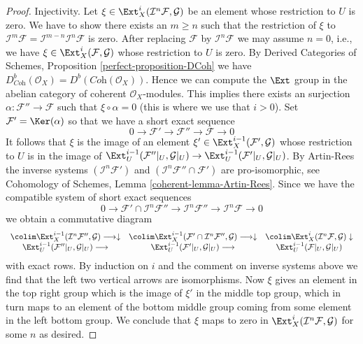 \begin{proof}
\medskip\noindent
Injectivity. Let $\xi \in \Ext^i_X(\mathcal{I}^n\mathcal{F}, \mathcal{G})$
be an element whose restriction to $U$ is zero. We have to show there exists
an $m \geq n$ such that the restriction of $\xi$ to
$\mathcal{I}^m\mathcal{F} = \mathcal{I}^{m - n}\mathcal{I}^n\mathcal{F}$
is zero. After replacing $\mathcal{F}$ by $\mathcal{I}^n\mathcal{F}$
we may assume $n = 0$, i.e., we have
$\xi \in \Ext^i_X(\mathcal{F}, \mathcal{G})$
whose restriction to $U$ is zero. By
Derived Categories of Schemes, Proposition \ref{perfect-proposition-DCoh}
we have
$D^b_{\textit{Coh}}(\mathcal{O}_X) = D^b(\textit{Coh}(\mathcal{O}_X))$.
Hence we can compute the $\Ext$ group in the abelian category of
coherent $\mathcal{O}_X$-modules. This implies there exists an
surjection $\alpha : \mathcal{F}'' \to \mathcal{F}$ such that
$\xi \circ \alpha = 0$ (this is where we use that $i > 0$).
Set $\mathcal{F}' = \Ker(\alpha)$ so that we have a short exact
sequence
$$
0 \to \mathcal{F}' \to \mathcal{F}'' \to \mathcal{F} \to 0
$$
It follows that $\xi$ is the image of an element
$\xi' \in \Ext^{i - 1}_X(\mathcal{F}', \mathcal{G})$
whose restriction to $U$ is in the image of
$\Ext^{i - 1}_U(\mathcal{F}''|_U, \mathcal{G}|_U) \to
\Ext^{i - 1}_U(\mathcal{F}'|_U, \mathcal{G}|_U)$.
By Artin-Rees the inverse systems $(\mathcal{I}^n\mathcal{F}')$ and
$(\mathcal{I}^n \mathcal{F}'' \cap \mathcal{F}')$ are pro-isomorphic, see
Cohomology of Schemes, Lemma \ref{coherent-lemma-Artin-Rees}.
Since we have the compatible system of short exact sequences
$$
0 \to
\mathcal{F}' \cap \mathcal{I}^n\mathcal{F}'' \to
\mathcal{I}^n\mathcal{F}'' \to
\mathcal{I}^n\mathcal{F} \to 0
$$
we obtain a commutative diagram
$$
\begin{array}{ccc}\colim \Ext^{i - 1}_X(\mathcal{I}^n\mathcal{F}'', \mathcal{G})
\longrightarrow\downarrow & \colim \Ext^{i - 1}_X(\mathcal{F}' \cap \mathcal{I}^n\mathcal{F}'', \mathcal{G})
\longrightarrow\downarrow & \colim \Ext^i_X(\mathcal{I}^n\mathcal{F}, \mathcal{G})
\downarrow \\ \Ext^{i - 1}_U(\mathcal{F}''|_U, \mathcal{G}|_U) \longrightarrow & \Ext^{i - 1}_U(\mathcal{F}'|_U, \mathcal{G}|_U) \longrightarrow & \Ext^{i - 1}_U(\mathcal{F}|_U, \mathcal{G}|_U)\end{array}
$$
with exact rows. By induction on $i$ and the comment on inverse systems above
we find that the left two vertical arrows are isomorphisms.
Now $\xi$ gives an element in the top right group which is the image
of $\xi'$ in the middle top group, which in turn maps to an element of
the bottom middle group coming from some element in the left bottom group.
We conclude that $\xi$ maps to zero in
$\Ext^i_X(\mathcal{I}^n\mathcal{F}, \mathcal{G})$
for some $n$ as desired.


\end{proof}
